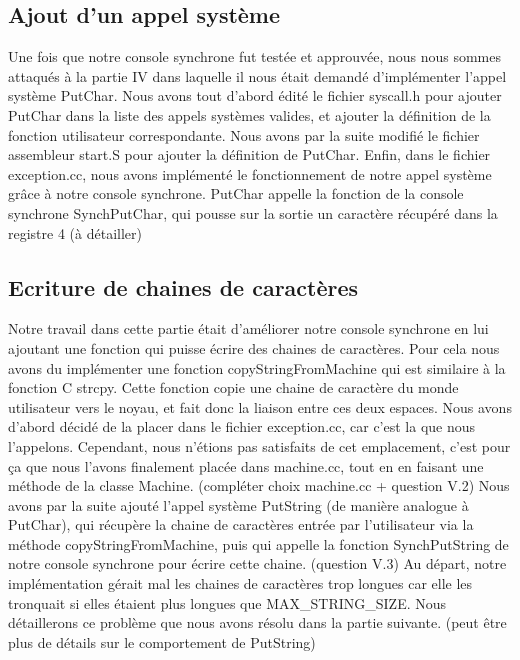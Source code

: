 \documentclass[12pt]{article}
\begin{document}
\subsection{Ajout d'un appel système}
Une fois que notre console synchrone fut testée et approuvée, nous nous sommes attaqués à la partie IV dans laquelle il nous était demandé d'implémenter l'appel système \textcolor{blue2}{PutChar}.
Nous avons tout d'abord édité le fichier \textcolor{vert2}{syscall.h} pour ajouter \textcolor{blue2}{PutChar} dans la liste des appels systèmes valides, et ajouter la définition de la fonction utilisateur correspondante.
Nous avons par la suite modifié le fichier assembleur \textcolor{vert2}{start.S} pour ajouter la définition de \textcolor{blue2}{PutChar}.
Enfin, dans le fichier \textcolor{vert2}{exception.cc}, nous avons implémenté le fonctionnement de notre appel système grâce à notre console synchrone. \textcolor{blue2}{PutChar} appelle la fonction de la console synchrone \textcolor{red2}{SynchPutChar}, qui pousse sur la sortie un caractère récupéré dans la registre 4 (à détailler)
\bigbreak
\subsection{Ecriture de chaines de caractères}
Notre travail dans cette partie était d'améliorer notre console synchrone en lui ajoutant une fonction qui puisse écrire des chaines de caractères. Pour cela nous avons du implémenter une fonction \textcolor{red2}{copyStringFromMachine} qui est similaire à la fonction C \textcolor{red2}{strcpy}. Cette fonction copie une chaine de caractère du monde utilisateur vers le noyau, et fait donc la liaison entre ces deux espaces.
\newline
Nous avons d'abord décidé de la placer dans le fichier \textcolor{vert2}{exception.cc}, car c'est la que nous l'appelons. Cependant, nous n'étions pas satisfaits de cet emplacement, c'est pour ça que nous l'avons finalement placée dans \textcolor{vert2}{machine.cc}, tout en en faisant une méthode de la classe Machine. (compléter choix machine.cc + question V.2)
\newline
Nous avons par la suite ajouté l'appel système \textcolor{blue2}{PutString} (de manière analogue à \textcolor{blue2}{PutChar}), qui récupère la chaine de caractères entrée par l'utilisateur via la méthode \textcolor{red2}{copyStringFromMachine}, puis qui appelle la fonction \textcolor{red2}{SynchPutString} de notre console synchrone pour écrire cette chaine. (question V.3)
Au départ, notre implémentation gérait mal les chaines de caractères trop longues car elle les tronquait si elles étaient plus longues que MAX\_STRING\_SIZE. Nous détaillerons ce problème que nous avons résolu dans la partie suivante. (peut être plus de détails sur le comportement de PutString)
\bigbreak
\end{document}
